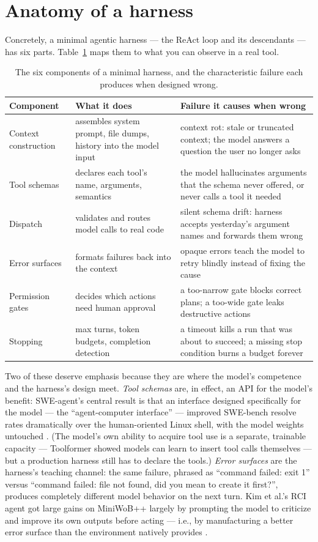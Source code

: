 \documentclass[11pt]{article}
\begin{document}
\section{Anatomy of a harness}
Concretely, a minimal agentic harness --- the ReAct loop and its descendants \cite{yao2023react} --- has six parts. Table~\ref{tab:anatomy} maps them to what you can observe in a real tool.

\begin{table}[h]
\centering
\begin{tabular}{lp{5.2cm}p{5.8cm}}
\hline
Component & What it does & Failure it causes when wrong \\
\hline
Context construction & assembles system prompt, file dumps, history into the model input & context rot: stale or truncated context; the model answers a question the user no longer asks \\
Tool schemas & declares each tool's name, arguments, semantics & the model hallucinates arguments that the schema never offered, or never calls a tool it needed \\
Dispatch & validates and routes model calls to real code & silent schema drift: harness accepts yesterday's argument names and forwards them wrong \\
Error surfaces & formats failures back into the context & opaque errors teach the model to retry blindly instead of fixing the cause \\
Permission gates & decides which actions need human approval & a too-narrow gate blocks correct plans; a too-wide gate leaks destructive actions \\
Stopping & max turns, token budgets, completion detection & a timeout kills a run that was about to succeed; a missing stop condition burns a budget forever \\
\hline
\end{tabular}
\caption{The six components of a minimal harness, and the characteristic failure each produces when designed wrong.}
\label{tab:anatomy}
\end{table}

Two of these deserve emphasis because they are where the model's competence and the harness's design meet. \emph{Tool schemas} are, in effect, an API for the model's benefit: SWE-agent's central result is that an interface designed specifically for the model --- the ``agent-computer interface'' --- improved SWE-bench resolve rates dramatically over the human-oriented Linux shell, with the model weights untouched \cite{yang2024sweagent}. (The model's own ability to acquire tool use is a separate, trainable capacity --- Toolformer showed models can learn to insert tool calls themselves \cite{schick2023toolformer} --- but a production harness still has to declare the tools.) \emph{Error surfaces} are the harness's teaching channel: the same failure, phrased as ``command failed: exit 1'' versus ``command failed: file not found, did you mean to create it first?'', produces completely different model behavior on the next turn. Kim et al.'s RCI agent got large gains on MiniWoB++ largely by prompting the model to criticize and improve its own outputs before acting --- i.e., by manufacturing a better error surface than the environment natively provides \cite{kim2023language}.
\end{document}
